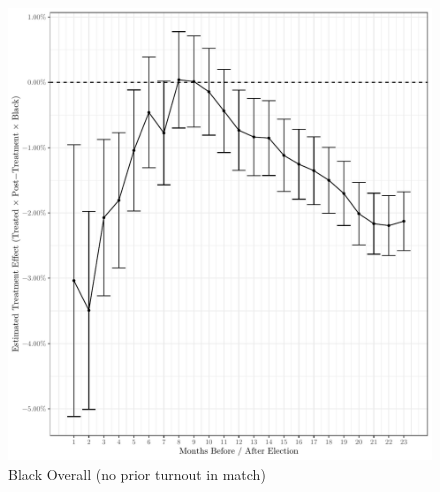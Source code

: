 \documentclass[
  12pt,
]{article}
\begin{document}
\begin{figure}[H]

{\centering \includegraphics{compile_files/figure-latex/black-overall-no-prior-1} 

}

\caption{\label{fig:did-1}Black Overall (no prior turnout in match)}\label{fig:black-overall-no-prior}
\end{figure}
\end{document}
